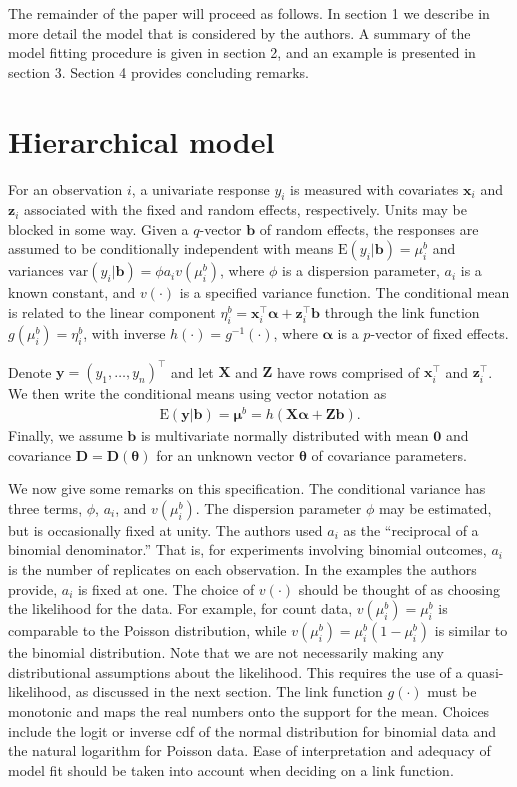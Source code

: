 \documentclass[12pt]{article}
\newcommand{\m}[1]{\mathbf{\bm{#1}}}
\newcommand{\E}{\mathrm{E}}
\newcommand{\var}{\mathrm{var}}
\begin{document}
The remainder of the paper will proceed as follows. In section 1 we describe in more detail the model that is considered by the authors. A summary of the model fitting procedure is given in section 2, and an example is presented in section 3. Section 4 provides concluding remarks.

\section{Hierarchical model}
 
\noindent For an observation $i$, a univariate response $y_i$ is measured with covariates $\m{x}_i$ and $\m{z}_i$ associated with the fixed and random effects, respectively. Units may be blocked in some way. Given a $q$-vector $\m{b}$ of random effects, the responses are assumed to be conditionally independent with means $\E(y_i|\m{b})=\mu_i^b$ and variances $\var(y_i|\m{b}) = \phi a_i v(\mu_i^b)$, where $\phi$ is a dispersion parameter, $a_i$ is a known constant, and $v(\cdot)$ is a specified variance function. The conditional mean is related to the linear component $\eta_i^b=\m{x}_i^\top\m{\alpha}+\m{z}_i^\top\m{b}$ through the link function $g(\mu_i^b)=\eta_i^b$, with inverse $h(\cdot)=g^{-1}(\cdot)$, where $\m{\alpha}$ is a $p$-vector of fixed effects.

Denote $\m{y}=(y_1,\ldots,y_n)^\top$ and let $\m{X}$ and $\m{Z}$ have rows comprised of $\m{x}_i^\top$ and $\m{z}_i^\top$. We then write the conditional means using vector notation as
\begin{eqnarray}
\E(\m{y}|\m{b}) = \m{\mu}^b = h(\m{X}\m{\alpha} + \m{Z}\m{b}).
\label{mod}
\end{eqnarray}
Finally, we assume $\m{b}$ is multivariate normally distributed with mean $\m{0}$ and covariance $\m{D}=\m{D}(\m{\theta})$ for an unknown vector $\m{\theta}$ of covariance parameters.

We now give some remarks on this specification. The conditional variance has three terms, $\phi$, $a_i$, and $v(\mu_i^b)$. The dispersion parameter $\phi$ may be estimated, but is occasionally fixed at unity. The authors used $a_i$ as the ``reciprocal of a binomial denominator.'' That is, for experiments involving binomial outcomes, $a_i$ is the number of replicates on each observation. In the examples the authors provide, $a_i$ is fixed at one. The choice of $v(\cdot)$ should be thought of as choosing the likelihood for the data. For example, for count data, $v(\mu_i^b)=\mu_i^b$ is comparable to the Poisson distribution, while $v(\mu_i^b)=\mu_i^b(1-\mu_i^b)$ is similar to the binomial distribution. Note that we are not necessarily making any distributional assumptions about the likelihood. This requires the use of a quasi-likelihood, as discussed in the next section. The link function $g(\cdot)$ must be monotonic and maps the real numbers onto the support for the mean. Choices include the logit or inverse cdf of the normal distribution for binomial data and the natural logarithm for Poisson data. Ease of interpretation and adequacy of model fit should be taken into account when deciding on a link function.
\end{document}
